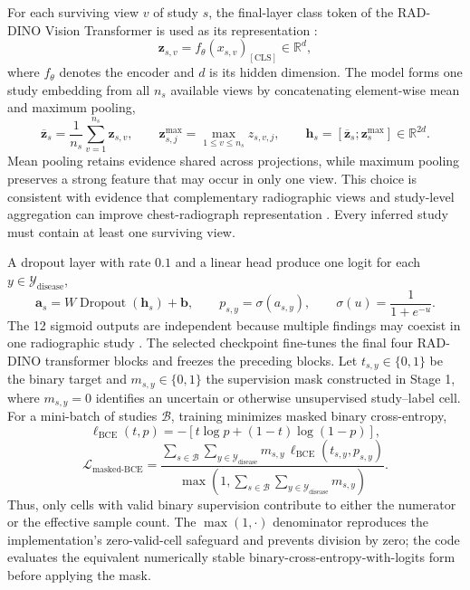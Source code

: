 For each surviving view $v$ of study $s$, the final-layer class token of the RAD-DINO Vision Transformer is used as its representation \cite{dosovitskiy2021image}:
\[
\mathbf z_{s,v}=f_{\theta}(x_{s,v})_{\mathrm{[CLS]}}
\in\mathbb R^d,
\]
where $f_{\theta}$ denotes the encoder and $d$ is its hidden dimension. The model forms one study embedding from all $n_s$ available views by concatenating element-wise mean and maximum pooling,
\[
\overline{\mathbf z}_s=\frac{1}{n_s}\sum_{v=1}^{n_s}\mathbf z_{s,v},
\qquad
\mathbf z^{\max}_{s,j}=\max_{1\leq v\leq n_s}z_{s,v,j},
\qquad
\mathbf h_s=[\overline{\mathbf z}_s;\mathbf z_s^{\max}]
\in\mathbb R^{2d}.
\]
Mean pooling retains evidence shared across projections, while maximum pooling preserves a strong feature that may occur in only one view. This choice is consistent with evidence that complementary radiographic views and study-level aggregation can improve chest-radiograph representation \cite{liu2022refers,kim2023chexfusion}. Every inferred study must contain at least one surviving view.

A dropout layer with rate $0.1$ and a linear head produce one logit for each $y\in\mathcal Y_{\mathrm{disease}}$,
\[
\mathbf a_s=W\operatorname{Dropout}(\mathbf h_s)+\mathbf b,
\qquad
p_{s,y}=\sigma(a_{s,y}),
\qquad
\sigma(u)=\frac{1}{1+e^{-u}}.
\]
The 12 sigmoid outputs are independent because multiple findings may coexist in one radiographic study \cite{wang2017chestxray8,irvin2019chexpert}. The selected checkpoint fine-tunes the final four RAD-DINO transformer blocks and freezes the preceding blocks. Let $t_{s,y}\in\{0,1\}$ be the binary target and $m_{s,y}\in\{0,1\}$ the supervision mask constructed in Stage 1, where $m_{s,y}=0$ identifies an uncertain or otherwise unsupervised study--label cell. For a mini-batch of studies $\mathcal B$, training minimizes masked binary cross-entropy,
\[
\ell_{\mathrm{BCE}}(t,p)
=-\left[t\log p+(1-t)\log(1-p)\right],
\]
\[
\mathcal L_{\mathrm{masked\text{-}BCE}}
=
\frac{
\displaystyle\sum_{s\in\mathcal B}
\sum_{y\in\mathcal Y_{\mathrm{disease}}}
m_{s,y}\,\ell_{\mathrm{BCE}}(t_{s,y},p_{s,y})
}{
\displaystyle\max\!\left(
1,
\sum_{s\in\mathcal B}
\sum_{y\in\mathcal Y_{\mathrm{disease}}}m_{s,y}
\right)
}.
\]
Thus, only cells with valid binary supervision contribute to either the numerator or the effective sample count. The $\max(1,\cdot)$ denominator reproduces the implementation's zero-valid-cell safeguard and prevents division by zero; the code evaluates the equivalent numerically stable binary-cross-entropy-with-logits form before applying the mask.

